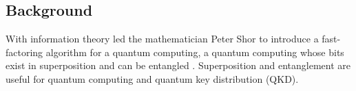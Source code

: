 \chapter{\babSatu}
\vspace*{0.2cm}

\section{Background}
With information theory led the mathematician Peter Shor to introduce a fast-factoring algorithm for a quantum computing, a quantum computing whose bits exist in superposition and can be entangled \cite{symetri}. Superposition and entanglement are useful for quantum computing and quantum key distribution (QKD).